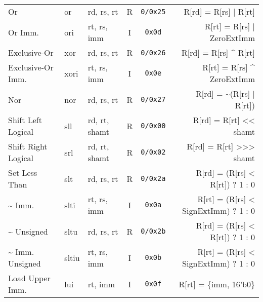 \begin{tabularx}{\textwidth}{lMAccD}
    Or                                                       & or    & rd, rs, rt    & R & \texttt{0/0x25} & R[rd] = R[rs] | R[rt]                                                           \\
    Or Imm.                                                  & ori   & rt, rs, imm   & I & \texttt{0x0d}   & R[rt] = R[rs] | ZeroExtImm                     \footnotemark[3]                 \\
    Exclusive-Or                                             & xor   & rd, rs, rt    & R & \texttt{0/0x26} & R[rd] = R[rs] \textasciicircum{} R[rt]                                          \\
    Exclusive-Or Imm.                                        & xori  & rt, rs, imm   & I & \texttt{0x0e}   & R[rt] = R[rs] \textasciicircum{} ZeroExtImm    \footnotemark[3]                 \\
    Nor                                                      & nor   & rd, rs, rt    & R & \texttt{0/0x27} & R[rd] = \textasciitilde (R[rs] | R[rt])                                         \\
    \midrule
    Shift Left Logical                                       & sll   & rd, rt, shamt & R & \texttt{0/0x00} & R[rd] = R[rt] <{}< shamt                                                        \\
    Shift Right Logical                                      & srl   & rd, rt, shamt & R & \texttt{0/0x02} & R[rd] = R[rt] >{}>{}> shamt                                                     \\
    \midrule
    Set Less Than                                            & slt   & rd, rs, rt    & R & \texttt{0/0x2a} & R[rd] = (R[rs] < R[rt]) ? 1 : 0                                                 \\
    \quad\textasciitilde{} Imm.                              & slti  & rt, rs, imm   & I & \texttt{0x0a}   & R[rt] = (R[rs] < SignExtImm) ? 1 : 0           \footnotemark[2]                 \\
    \quad\textasciitilde{} Unsigned                          & sltu  & rd, rs, rt    & R & \texttt{0/0x2b} & R[rd] = (R[rs] < R[rt]) ? 1 : 0                \footnotemark[6]                 \\
    \quad\textasciitilde{} Imm. Unsigned                     & sltiu & rt, rs, imm   & I & \texttt{0x0b}   & R[rt] = (R[rs] < SignExtImm) ? 1 : 0           \footnotemark[2]\footnotemark[6] \\
    \midrule
    Load Upper Imm.                                          & lui   & rt, imm       & I & \texttt{0x0f}   & R[rt] = \{imm, 16'b0\}                                                          \\

\end{tabularx}
